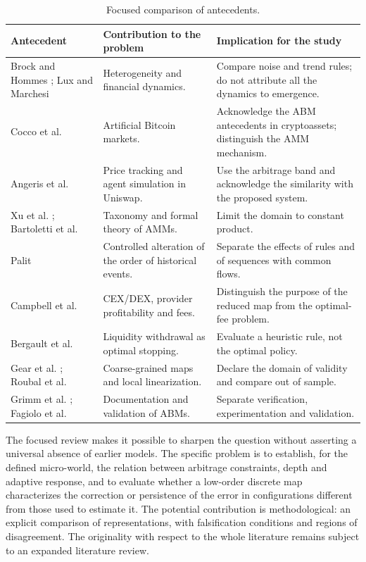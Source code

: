 \begin{table}[htbp]
\centering
\caption{Focused comparison of antecedents.}
\label{tab:antecedentes}
\small
\begin{tabularx}{\textwidth}{@{}>{\raggedright\arraybackslash}p{3.3cm} >{\raggedright\arraybackslash}X >{\raggedright\arraybackslash}X@{}}
\toprule
Antecedent & Contribution to the problem & Implication for the study \\
\midrule
Brock and Hommes \cite{brock1998heterogeneous}; Lux and Marchesi \cite{lux1999scaling} & Heterogeneity and financial dynamics. & Compare noise and trend rules; do not attribute all the dynamics to emergence. \\
Cocco et al. \cite{cocco2017artificial,cocco2019agent} & Artificial Bitcoin markets. & Acknowledge the ABM antecedents in cryptoassets; distinguish the AMM mechanism. \\
Angeris et al. \cite{angeris2020uniswap} & Price tracking and agent simulation in Uniswap. & Use the arbitrage band and acknowledge the similarity with the proposed system. \\
Xu et al. \cite{xu2023sok}; Bartoletti et al. \cite{bartoletti2022theory} & Taxonomy and formal theory of AMMs. & Limit the domain to constant product. \\
Palit \cite{palit2022shuffled} & Controlled alteration of the order of historical events. & Separate the effects of rules and of sequences with common flows. \\
Campbell et al. \cite{campbell2025optimal} & CEX/DEX, provider profitability and fees. & Distinguish the purpose of the reduced map from the optimal-fee problem. \\
Bergault et al. \cite{bergault2025exit} & Liquidity withdrawal as optimal stopping. & Evaluate a heuristic rule, not the optimal policy. \\
Gear et al. \cite{gear2003equationfree}; Roubal et al. \cite{roubal2010linearization} & Coarse-grained maps and local linearization. & Declare the domain of validity and compare out of sample. \\
Grimm et al. \cite{grimm2020odd}; Fagiolo et al. \cite{fagiolo2007critical} & Documentation and validation of ABMs. & Separate verification, experimentation and validation. \\
\bottomrule
\end{tabularx}
\end{table}

The focused review makes it possible to sharpen the question without asserting a universal absence of earlier models. The specific problem is to establish, for the defined micro-world, the relation between arbitrage constraints, depth and adaptive response, and to evaluate whether a low-order discrete map characterizes the correction or persistence of the error in configurations different from those used to estimate it. The potential contribution is methodological: an explicit comparison of representations, with falsification conditions and regions of disagreement. The originality with respect to the whole literature remains subject to an expanded literature review.

